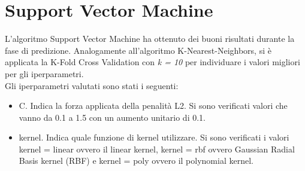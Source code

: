 \section{Support Vector Machine}
L'algoritmo Support Vector Machine ha ottenuto dei buoni risultati durante la fase di predizione. Analogamente all'algoritmo K-Nearest-Neighbors, si è applicata la K-Fold Cross Validation con \emph{k = 10} per individuare i valori migliori per gli iperparametri.\\
Gli iperparametri valutati sono stati i seguenti:
\begin{itemize}
	\item \textsf{C}. Indica la forza applicata della penalità L2. Si sono verificati valori che vanno da 0.1 a 1.5 con un aumento unitario di 0.1.
	\item \textsf{kernel}. Indica quale funzione di kernel utilizzare. Si sono verificati i valori kernel = linear ovvero il linear kernel, kernel = rbf ovvero Gaussian Radial Basis kernel (RBF) e kernel = poly ovvero il polynomial kernel.
\end{itemize}

